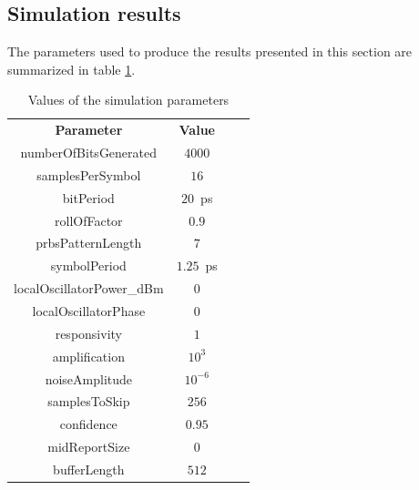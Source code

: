 
\pagebreak
\subsection*{Simulation results}

The parameters used to produce the results presented in this section are summarized in table \ref{table:par}.

\begin{table}[]
	\centering
	\caption{Values of the simulation parameters}
	\begin{tabular}{|c|c|cc}
		\cline{1-2}
		\textbf{Parameter} & \textbf{Value} & \\ \cline{1-2}
		numberOfBitsGenerated & $4000$ & \\ \cline{1-2}
		samplesPerSymbol & $16$ & \\ \cline{1-2}
		bitPeriod & $20$~ps & \\ \cline{1-2}
		rollOfFactor & $0.9$ & \\ \cline{1-2}
		prbsPatternLength & $7$ & \\ \cline{1-2}
		symbolPeriod & $1.25$~ps & \\ \cline{1-2}
		localOscillatorPower\_dBm & $0$ & \\ \cline{1-2}
		localOscillatorPhase & $0$ & \\ \cline{1-2}
		responsivity & $1$ & \\ \cline{1-2}
		amplification & $10^3$ & \\ \cline{1-2}
		noiseAmplitude & $10^{-6}$ & \\ \cline{1-2}
		samplesToSkip & $256$ & \\ \cline{1-2}
		confidence & $0.95$ & \\ \cline{1-2}
		midReportSize & $0$ & \\ \cline{1-2}
		bufferLength & $512$ & \\ \cline{1-2}
	\end{tabular}
	\label{table:par}
\end{table}

